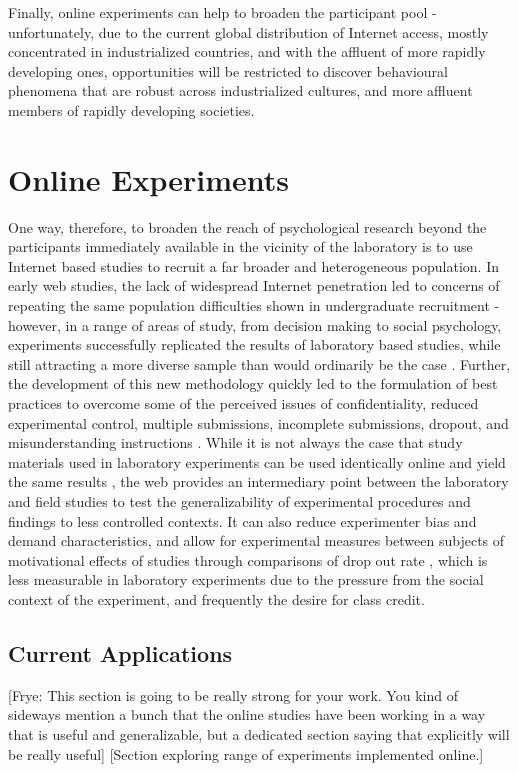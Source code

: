 \documentclass[12pt,a4paper,titlepage]{scrreprt}
\begin{document}
Finally, online experiments can help to broaden the participant pool \parencite{gosling_wired_2010} - unfortunately, due to the current global distribution of Internet access, mostly concentrated in industrialized countries, and with the affluent of more rapidly developing ones, opportunities will be restricted to discover behavioural phenomena that are robust across industrialized cultures, and more affluent members of rapidly developing societies.
\section{Online Experiments}
One way, therefore, to broaden the reach of psychological research beyond the participants immediately available in the vicinity of the laboratory is to use Internet based studies to recruit a far broader and heterogeneous population. In early web studies, the lack of widespread Internet penetration led to concerns of repeating the same population difficulties shown in undergraduate recruitment - however, in a range of areas of study, from decision making to social psychology, experiments successfully replicated the results of laboratory based studies, while still attracting a more diverse sample than would ordinarily be the case \parencite{krantz_comparing_1997,buchanan_using_1999,birnbaum_decision_2000,mcgraw_integrity_2000,gosling_should_2004,ritter_internet_2004}. Further, the development of this new methodology quickly led to the formulation of best practices to overcome some of the perceived issues of confidentiality, reduced experimental control, multiple submissions, incomplete submissions, dropout, and misunderstanding instructions \parencite{reips_web_2000,reips_standards_2002,birnbaum_human_2004}. While it is not always the case that study materials used in laboratory experiments can be used identically online and yield the same results \parencite{buchanan_nonequivalence_2005}, the web provides an intermediary point between the laboratory and field studies to test the generalizability of experimental procedures and findings to less controlled contexts. It can also reduce experimenter bias and demand characteristics, and allow for experimental measures between subjects of motivational effects of studies through comparisons of drop out rate \parencite{reips_web_2000}, which is less measurable in laboratory experiments due to the pressure from the social context of the experiment, and frequently the desire for class credit.
\subsection{Current Applications}
[Frye: This section is going to be really strong for your work. You kind of sideways mention a bunch that the online studies have been working in a way that is useful and generalizable, but a dedicated section saying that explicitly will be really useful]
[Section exploring range of experiments implemented online.]
\end{document}
